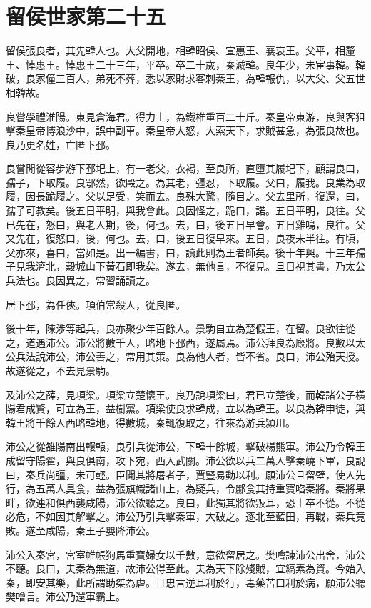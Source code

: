 \chapter{留侯世家第二十五}

留侯張良者，其先韓人也。大父開地，相韓昭侯、宣惠王、襄哀王。父平，相釐王、悼惠王。悼惠王二十三年，平卒。卒二十歲，秦滅韓。良年少，未宦事韓。韓破，良家僮三百人，弟死不葬，悉以家財求客刺秦王，為韓報仇，以大父、父五世相韓故。

良嘗學禮淮陽。東見倉海君。得力士，為鐵椎重百二十斤。秦皇帝東游，良與客狙擊秦皇帝博浪沙中，誤中副車。秦皇帝大怒，大索天下，求賊甚急，為張良故也。良乃更名姓，亡匿下邳。

良嘗閒從容步游下邳圯上，有一老父，衣褐，至良所，直墮其履圯下，顧謂良曰，孺子，下取履。良鄂然，欲毆之。為其老，彊忍，下取履。父曰，履我。良業為取履，因長跪履之。父以足受，笑而去。良殊大驚，隨目之。父去里所，復還，曰，孺子可教矣。後五日平明，與我會此。良因怪之，跪曰，諾。五日平明，良往。父已先在，怒曰，與老人期，後，何也。去，曰，後五日早會。五日雞鳴，良往。父又先在，復怒曰，後，何也。去，曰，後五日復早來。五日，良夜未半往。有頃，父亦來，喜曰，當如是。出一編書，曰，讀此則為王者師矣。後十年興。十三年孺子見我濟北，穀城山下黃石即我矣。遂去，無他言，不復見。旦日視其書，乃太公兵法也。良因異之，常習誦讀之。

居下邳，為任俠。項伯常殺人，從良匿。

後十年，陳涉等起兵，良亦聚少年百餘人。景駒自立為楚假王，在留。良欲往從之，道遇沛公。沛公將數千人，略地下邳西，遂屬焉。沛公拜良為廄將。良數以太公兵法說沛公，沛公善之，常用其策。良為他人者，皆不省。良曰，沛公殆天授。故遂從之，不去見景駒。

及沛公之薛，見項梁。項梁立楚懷王。良乃說項梁曰，君已立楚後，而韓諸公子橫陽君成賢，可立為王，益樹黨。項梁使良求韓成，立以為韓王。以良為韓申徒，與韓王將千餘人西略韓地，得數城，秦輒復取之，往來為游兵潁川。

沛公之從雒陽南出轘轅，良引兵從沛公，下韓十餘城，擊破楊熊軍。沛公乃令韓王成留守陽翟，與良俱南，攻下宛，西入武關。沛公欲以兵二萬人擊秦嶢下軍，良說曰，秦兵尚彊，未可輕。臣聞其將屠者子，賈豎易動以利。願沛公且留壁，使人先行，為五萬人具食，益為張旗幟諸山上，為疑兵，令酈食其持重寶啗秦將。秦將果畔，欲連和俱西襲咸陽，沛公欲聽之。良曰，此獨其將欲叛耳，恐士卒不從。不從必危，不如因其解擊之。沛公乃引兵擊秦軍，大破之。逐北至藍田，再戰，秦兵竟敗。遂至咸陽，秦王子嬰降沛公。

沛公入秦宮，宮室帷帳狗馬重寶婦女以千數，意欲留居之。樊噲諫沛公出舍，沛公不聽。良曰，夫秦為無道，故沛公得至此。夫為天下除殘賊，宜縞素為資。今始入秦，即安其樂，此所謂助桀為虐。且忠言逆耳利於行，毒藥苦口利於病，願沛公聽樊噲言。沛公乃還軍霸上。

